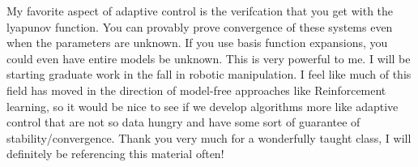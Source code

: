 \documentclass[12pt]{article}
\begin{document}
\noindent
My favorite aspect of adaptive control is the verifcation that you get with the lyapunov function. You can provably prove convergence of these systems even when the parameters are unknown. If you use basis function expansions, you could even have entire models be unknown. This is very powerful to me. I will be starting graduate work in the fall in robotic manipulation. I feel like much of this field has moved in the direction of model-free approaches like Reinforcement learning, so it would be nice to see if we develop algorithms more like adaptive control that are not so data hungry and have some sort of guarantee of stability/convergence. Thank you very much for a wonderfully taught class, I will definitely be referencing this material often!
\\
\end{document}
